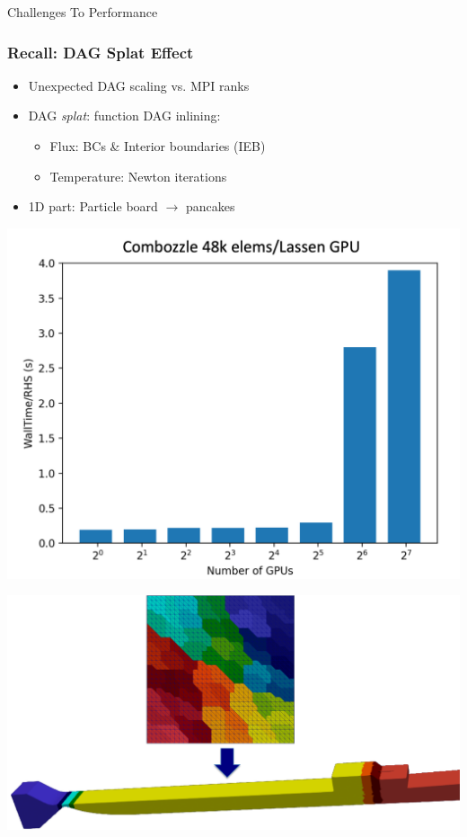 \begin{frame}
    \centering
    \Large
    Challenges To Performance
\end{frame}

\begin{frame}\frametitle{Recall: DAG Splat Effect}
\vspace{5pt}
  \begin{minipage}{0.49\textwidth}		
    \begin{itemize}
    \item Unexpected DAG scaling vs. MPI ranks
    \item DAG \textit{splat}: function DAG inlining:
    \begin{itemize}
    \item Flux: BCs \& Interior boundaries (IEB)
    \item Temperature: Newton iterations
    \end{itemize}
    \item 1D part: Particle board $\rightarrow$ pancakes
    \end{itemize}
    \begin{center}
    \includegraphics[width=.8\textwidth]{Figures/mtc/combozzle_weak_bad_partitioning.png}
    \end{center}
  \end{minipage}
  \begin{minipage}{0.49\textwidth}
      \centering
      \includegraphics[width=.8\textwidth]{Figures/mtc/MetisTo1D.png} \\

\end{minipage}
\end{frame}
